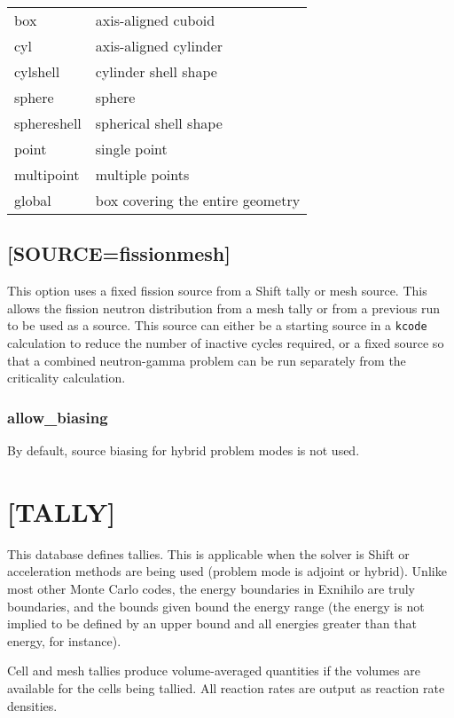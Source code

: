 \documentclass[10pt]{article}
\begin{document}
\begin{tabular}{l l}
box & axis-aligned cuboid\\
cyl & axis-aligned cylinder\\
cylshell & cylinder shell shape\\
sphere & sphere\\
sphereshell & spherical shell shape\\
point & single point\\
multipoint & multiple points\\
global & box covering the entire geometry\\
\end{tabular}



\subsection{[SOURCE=fissionmesh]}

This option uses a fixed fission source from a Shift tally or mesh source. This allows the fission neutron distribution from a mesh tally or from a previous run to be used as a source. This source can either be a starting source in a \texttt{kcode} calculation to reduce the number of inactive cycles required, or a fixed source so that a combined neutron-gamma problem can be run separately from the criticality calculation. 

\subsubsection{allow\_biasing}

By default, source biasing for hybrid problem modes is not used.


\section{[TALLY]}
This database defines tallies. This is applicable when the solver is Shift or acceleration methods are being used (problem mode is adjoint or hybrid). Unlike most other Monte Carlo codes, the energy boundaries in Exnihilo are truly boundaries, and the bounds given bound the energy range (the energy is not implied to be defined by an upper bound and all energies greater than that energy, for instance). 

Cell and mesh tallies produce volume-averaged quantities if the volumes are available for the cells being tallied. All reaction rates are output as reaction rate densities. 
\end{document}
